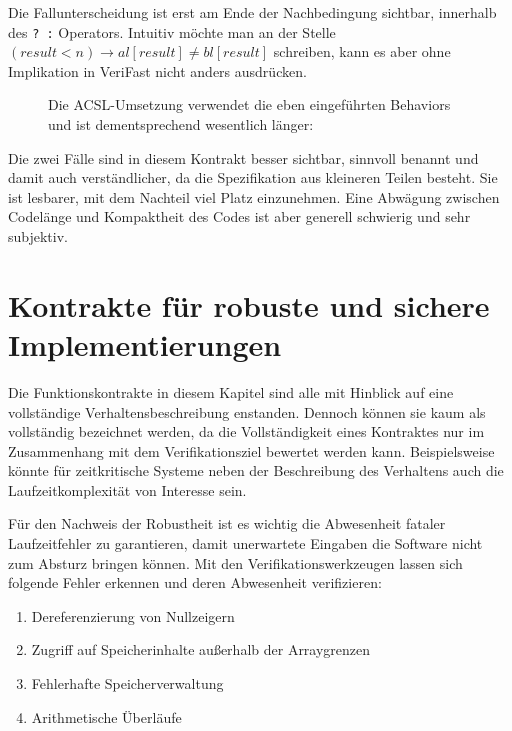 Die Fallunterscheidung ist erst am Ende der Nachbedingung sichtbar, innerhalb des \lstinline{? :} Operators.
Intuitiv möchte man an der Stelle \((result < n) \rightarrow al[result] \neq  bl[result]\)
schreiben, kann es aber ohne Implikation in VeriFast nicht anders ausdrücken.

\begin{figure}[H]
Die ACSL-Umsetzung verwendet die eben eingeführten Behaviors und ist dementsprechend wesentlich länger:

\end{figure}

Die zwei Fälle sind in diesem Kontrakt besser sichtbar, sinnvoll benannt und damit auch verständlicher, 
da die Spezifikation aus kleineren Teilen besteht. Sie ist lesbarer, mit dem Nachteil viel Platz einzunehmen.
Eine Abwägung zwischen Codelänge und Kompaktheit des Codes ist aber generell schwierig und sehr subjektiv.


\section{Kontrakte für robuste und sichere Implementierungen}
\label{sec:design-by-contract:partielle-korrektheit}

Die Funktionskontrakte in diesem Kapitel sind alle mit Hinblick auf eine vollständige Verhaltensbeschreibung
enstanden. Dennoch können sie kaum als vollständig bezeichnet werden, da die Vollständigkeit eines Kontraktes
nur im Zusammenhang mit dem Verifikationsziel bewertet werden kann. Beispielsweise könnte für zeitkritische
Systeme neben der Beschreibung des Verhaltens auch die Laufzeitkomplexität von Interesse sein.

Für den Nachweis der Robustheit ist es wichtig die Abwesenheit fataler Laufzeitfehler zu garantieren,
damit unerwartete Eingaben die Software nicht zum Absturz bringen können. Mit den Verifikationswerkzeugen lassen 
sich folgende Fehler erkennen und deren Abwesenheit verifizieren:
\begin{enumerate}
\item Dereferenzierung von Nullzeigern
\item Zugriff auf Speicherinhalte außerhalb der Arraygrenzen
\item Fehlerhafte Speicherverwaltung
\item Arithmetische Überläufe
\end{enumerate}

